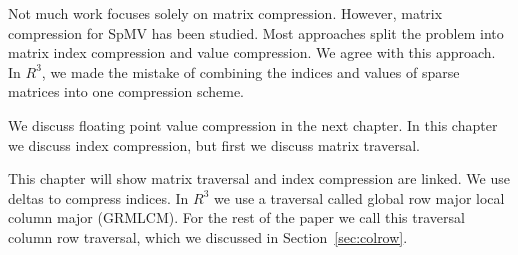 Not much work focuses solely on matrix compression. However, matrix compression for SpMV has been studied. Most approaches split the problem into matrix index compression and value compression. We agree with this approach. In $R^3$, we made the mistake of combining the indices and values of sparse matrices into one compression scheme. 
\par We discuss floating point value compression in the next chapter. In this chapter we discuss index compression, but first we discuss matrix traversal. \par
This chapter will show matrix traversal and index compression are linked. We use deltas to compress indices. In $R^3$ we use a traversal called global row major local column major (GRMLCM). For the rest of the paper we call this traversal column row traversal, which we discussed in Section~\ref{sec:colrow}. \par

